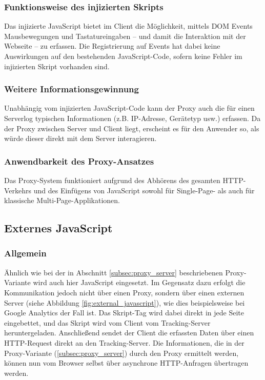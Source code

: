 \subsubsection{Funktionsweise des injizierten Skripts}
Das injizierte JavaScript bietet im Client die Möglichkeit, mittels DOM Events \cite{mdn2025_domevents} Mausbewegungen und Tastatureingaben – und damit die Interaktion mit der Webseite – zu erfassen. Die Registrierung auf Events hat dabei keine Auswirkungen auf den bestehenden JavaScript-Code, sofern keine Fehler im injizierten Skript vorhanden sind.

\subsubsection{Weitere Informationsgewinnung}
Unabhängig vom injizierten JavaScript-Code kann der Proxy auch die für einen Serverlog typischen Informationen (z.B. IP-Adresse, Gerätetyp usw.) erfassen. Da der Proxy zwischen Server und Client liegt, erscheint es für den Anwender so, als würde dieser direkt mit dem Server interagieren.

\subsubsection{Anwendbarkeit des Proxy-Ansatzes}
Das Proxy-System funktioniert aufgrund des Abhörens des gesamten HTTP-Verkehrs und des Einfügens von JavaScript sowohl für Single-Page- als auch für klassische Multi-Page-Applikationen.

\subsection{Externes JavaScript}
\label{subsec:external_js}

\subsubsection{Allgemein}
Ähnlich wie bei der in Abschnitt \ref{subsec:proxy_server} beschriebenen Proxy-Variante wird auch hier JavaScript eingesetzt. Im Gegensatz dazu erfolgt die Kommunikation jedoch nicht über einen Proxy, sondern über einen externen Server (siehe Abbildung \ref{fig:external_javascript}), wie dies beispielsweise bei Google Analytics \cite{weber2015practical} der Fall ist. Das Skript-Tag wird dabei direkt in jede Seite eingebettet, und das Skript wird vom Client vom Tracking-Server heruntergeladen. Anschließend sendet der Client die erfassten Daten über einen HTTP-Request direkt an den Tracking-Server.  
Die Informationen, die in der Proxy-Variante (\ref{subsec:proxy_server}) durch den Proxy ermittelt werden, können nun vom Browser selbst über asynchrone HTTP-Anfragen übertragen werden.

